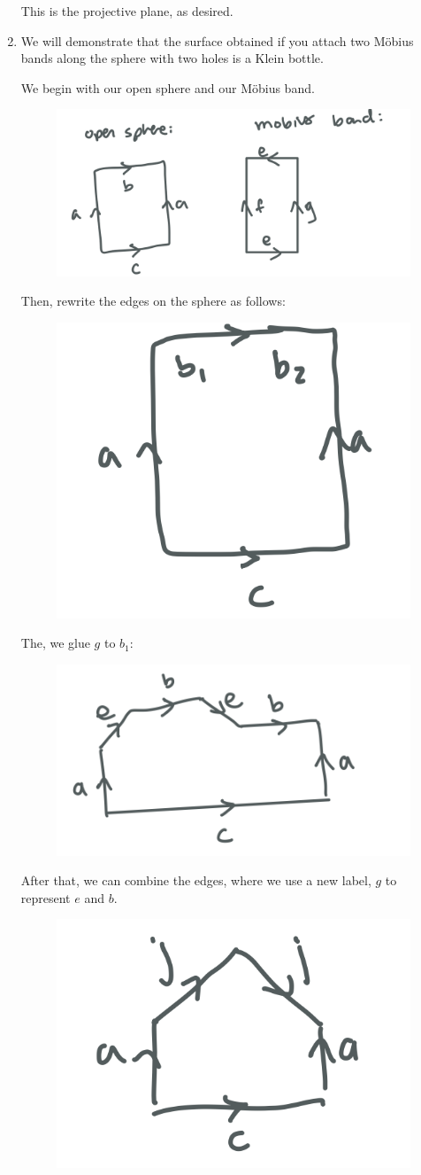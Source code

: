 \documentclass[12pt]{article}
\begin{document}
\begin{enumerate}
This is the projective plane, as desired.

\newpage

\item We will demonstrate that the surface obtained if you attach two Möbius bands along the sphere with two holes is a Klein bottle.

We begin with our open sphere and our Möbius band.

\begin{figure}[h!] 
    \centering
    \includegraphics[width=0.7\linewidth]{2-1.png} 
\end{figure}

Then, rewrite the edges on the sphere as follows:
\begin{figure}[h!] 
    \centering
    \includegraphics[width=0.3\linewidth]{2-2.png} 
\end{figure}

The, we glue $g$ to $b_1$:
\begin{figure}[H] 
    \centering
    \includegraphics[width=0.5\linewidth]{2-3.png} 
\end{figure}

After that, we can combine the edges, where we use a new label, $g$ to represent $e$ and $b$.
\begin{figure}[H] 
    \centering
    \includegraphics[width=0.3\linewidth]{2-4.png} 
\end{figure}


\end{enumerate}
\end{document}
